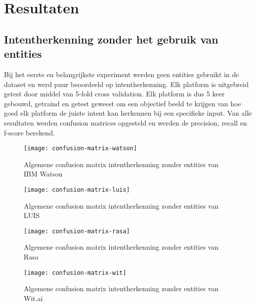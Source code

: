 
\chapter{Resultaten}
\label{ch:resultaten}

\section{Intentherkenning zonder het gebruik van entities}
\label{intent}

Bij het eerste en belangrijkste experiment werden geen entities gebruikt in de dataset en werd puur beoordeeld op intentherkenning. Elk platform is uitgebreid getest door middel van 5-fold cross validation. Elk platform is dus 5 keer gebouwd, getraind en getest geweest om een objectief beeld te krijgen van hoe goed elk platform de juiste intent kan herkennen bij een specifieke input. Van alle resultaten werden confusion matrices opgesteld en werden de precision, recall en f-score berekend.

\begin{figure}[H]
    \label{fig:confusion-matrix-watson}
    \centering
    \texttt{[image: confusion-matrix-watson]}
    \caption{Algemene confusion matrix intentherkenning zonder entities van IBM Watson}
\end{figure}

\begin{figure}[H]
    \label{fig:confusion-matrix-luis}
    \centering
    \texttt{[image: confusion-matrix-luis]}
    \caption{Algemene confusion matrix intentherkenning zonder entities van LUIS}
\end{figure}

\begin{figure}[H]
    \label{fig:confusion-matrix-rasa}
    \centering
    \texttt{[image: confusion-matrix-rasa]}
    \caption{Algemene confusion matrix intentherkenning zonder entities van Rasa}
\end{figure}

\begin{figure}[H]
    \label{fig:confusion-matrix-wit}
    \centering
    \texttt{[image: confusion-matrix-wit]}
    \caption{Algemene confusion matrix intentherkenning zonder entities van Wit.ai}
\end{figure}

